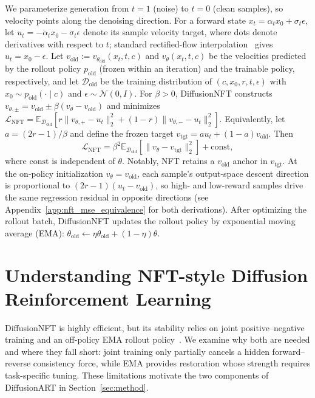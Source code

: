 \documentclass{article}
\begin{document}
We parameterize generation from $t=1$ (noise) to $t=0$ (clean samples), so velocity points along the denoising direction. For a forward state $x_t=\alpha_t x_0+\sigma_t\epsilon$, let $u_t=-\dot{\alpha}_t x_0-\dot{\sigma}_t\epsilon$ denote its sample velocity target, where dots denote derivatives with respect to $t$; standard rectified-flow interpolation~\citep{lipman2022flowmatching,liu2022flowstraightfastlearning} gives $u_t=x_0-\epsilon$. Let $v_{\mathrm{old}}:=v_{\theta_{\mathrm{old}}}(x_t,t,c)$ and $v_\theta(x_t,t,c)$ be the velocities predicted by the rollout policy $p_{\mathrm{old}}$ (frozen within an iteration) and the trainable policy, respectively, and let $\mathcal D_{\mathrm{old}}$ be the training distribution of $(c,x_0,r,t,\epsilon)$ with $x_0\sim p_{\mathrm{old}}(\cdot\mid c)$ and $\epsilon\sim\mathcal N(0,I)$. For $\beta>0$, DiffusionNFT constructs $v_{\theta,\pm}=v_{\mathrm{old}}\pm\beta(v_\theta-v_{\mathrm{old}})$ and minimizes $\mathcal L_{\mathrm{NFT}}=\mathbb E_{\mathcal D_{\mathrm{old}}}[r\lVert v_{\theta,+}-u_t\rVert_2^2+(1-r)\lVert v_{\theta,-}-u_t\rVert_2^2]$. Equivalently, let $a=(2r-1)/\beta$ and define the frozen target $v_{\mathrm{tgt}}=a u_t+(1-a)v_{\mathrm{old}}$. Then
\begin{equation}
\label{eq:nft_objective}
\mathcal L_{\mathrm{NFT}}=\beta^2\mathbb E_{\mathcal D_{\mathrm{old}}}\!\left[\lVert v_\theta-v_{\mathrm{tgt}}\rVert_2^2\right]+\mathrm{const},
\end{equation}
where $\mathrm{const}$ is independent of $\theta$. Notably, NFT retains a $v_{\mathrm{old}}$ anchor in $v_{\mathrm{tgt}}$. At the on-policy initialization $v_\theta=v_{\mathrm{old}}$, each sample's output-space descent direction is proportional to $(2r-1)(u_t-v_{\mathrm{old}})$, so high- and low-reward samples drive the same regression residual in opposite directions (see Appendix~\ref{app:nft_mse_equivalence} for both derivations). After optimizing the rollout batch, DiffusionNFT updates the rollout policy by exponential moving average (EMA): $\theta_{\mathrm{old}}\leftarrow\eta\theta_{\mathrm{old}}+(1-\eta)\theta$.

\section{Understanding NFT-style Diffusion Reinforcement Learning}
\label{sec:motivation}
DiffusionNFT is highly efficient, but its stability relies on joint positive--negative training and an off-policy EMA rollout policy~\citep{zheng2025diffusionnft}. We examine why both are needed and where they fall short: joint training only partially cancels a hidden forward--reverse consistency force, while EMA provides restoration whose strength requires task-specific tuning. These limitations motivate the two components of DiffusionART in Section~\ref{sec:method}.
\end{document}
